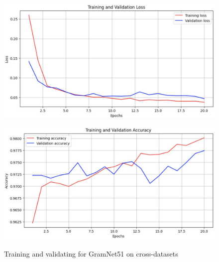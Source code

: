 \documentclass[rebuttal]{cvpr}
\begin{document}
\begin{figure}[t]
\centering
\begin{minipage}{0.45\linewidth}
   \includegraphics[width=\linewidth]{images/gramnet51_cd_loss.jpg}
   \label{fig:image1}
\end{minipage}
\hfill
\begin{minipage}{0.45\linewidth}
   \includegraphics[width=\linewidth]{images/gramnet51_cd_acc.jpg}
   \label{fig:image2}
\end{minipage}
\caption{Training and validating for GramNet51 on cross-datasets}
\label{fig:gramnet51_cd}
\end{figure}

\end{document}
